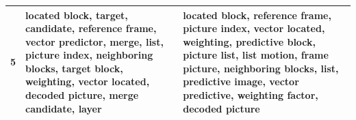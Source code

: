 \begin{table}[htbp]
\begin{tabular}{|r|p{16em}|p{18em}|}
    \midrule
    5 & \textbf{located} \textbf{block},  target,  candidate,  \textbf{reference} \textbf{frame},  vector predictor,  merge,  \textbf{list},  \textbf{picture} \textbf{index},  \textbf{neighboring} \textbf{blocks},  target block,  \textbf{weighting},  \textbf{vector} \textbf{located},  \textbf{decoded} \textbf{picture},  merge candidate,  layer & \textbf{located} \textbf{block},  \textbf{reference} \textbf{frame},  \textbf{picture} \textbf{index},  \textbf{vector} \textbf{located},  \textbf{weighting},  predictive block,  picture list,  list motion,  frame picture,  \textbf{neighboring} \textbf{blocks},  \textbf{list},  predictive image,  vector predictive,  weighting factor,  \textbf{decoded} \textbf{picture} \\
    \bottomrule
    \end{tabular}%
  \label{tab:addlabel}%
\end{table}%


